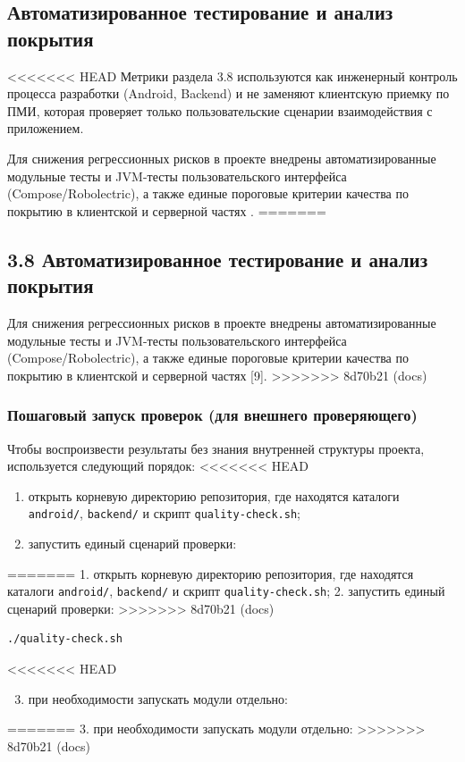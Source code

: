 \subsection{Автоматизированное тестирование и анализ покрытия}

<<<<<<< HEAD
Метрики раздела 3.8 используются как инженерный контроль процесса разработки (Android, Backend) и не заменяют клиентскую приемку по ПМИ, которая проверяет только пользовательские сценарии взаимодействия с приложением.

Для снижения регрессионных рисков в проекте внедрены автоматизированные модульные тесты и JVM-тесты пользовательского интерфейса (Compose/Robolectric), а также единые пороговые критерии качества по покрытию в клиентской и серверной частях .
=======
\subsection{3.8 Автоматизированное тестирование и анализ покрытия}

Для снижения регрессионных рисков в проекте внедрены автоматизированные модульные тесты и JVM-тесты пользовательского интерфейса (Compose/Robolectric), а также единые пороговые критерии качества по покрытию в клиентской и серверной частях [9].
>>>>>>> 8d70b21 (docs)

\subsubsection{Пошаговый запуск проверок (для внешнего проверяющего)}

Чтобы воспроизвести результаты без знания внутренней структуры проекта, используется следующий порядок:
<<<<<<< HEAD
\begin{enumerate}
    \item открыть корневую директорию репозитория, где находятся каталоги \texttt{android/}, \texttt{backend/} и скрипт \texttt{quality-check.sh};
    \item запустить единый сценарий проверки:
\end{enumerate}
=======
1. открыть корневую директорию репозитория, где находятся каталоги \texttt{android/}, \texttt{backend/} и скрипт \texttt{quality-check.sh};
2. запустить единый сценарий проверки:
>>>>>>> 8d70b21 (docs)

\begin{verbatim}
./quality-check.sh
\end{verbatim}

<<<<<<< HEAD
\begin{enumerate}
    \setcounter{enumi}{2}
    \item при необходимости запускать модули отдельно:
\end{enumerate}
=======
3. при необходимости запускать модули отдельно:
>>>>>>> 8d70b21 (docs)

